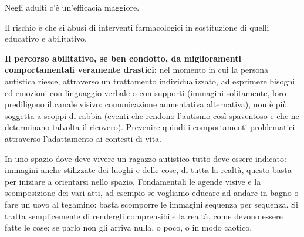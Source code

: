 Negli adulti c'è un'efficacia maggiore.

Il rischio è che si abusi di interventi farmacologici in sostituzione di
quelli educativo e abilitativo.

\textbf{Il percorso abilitativo, se ben condotto, da miglioramenti
comportamentali veramente drastici:} nel momento in cui la persona
autistica riesce, attraverso un trattamento individualizzato, ad
esprimere bisogni ed emozioni con linguaggio verbale o con supporti
(immagini solitamente, loro prediligono il canale visivo: comunicazione
aumentativa alternativa), non è più soggetta a scoppi di rabbia (eventi
che rendono l'autismo così spaventoso e che ne determinano talvolta il
ricovero). Prevenire quindi i comportamenti problematici attraverso
l'adattamento ai contesti di vita.

In uno spazio dove deve vivere un ragazzo autistico tutto deve essere
indicato: immagini anche stilizzate dei luoghi e delle cose, di tutta la
realtà, questo basta per iniziare a orientarsi nello spazio.
Fondamentali le agende visive e la scomposizione dei vari atti, ad
esempio se vogliamo educare ad andare in bagno o fare un uovo al
tegamino: basta scomporre le immagini sequenza per sequenza. Si tratta
semplicemente di rendergli comprensibile la realtà, come devono essere
fatte le cose; se parlo non gli arriva nulla, o poco, o in modo caotico.
